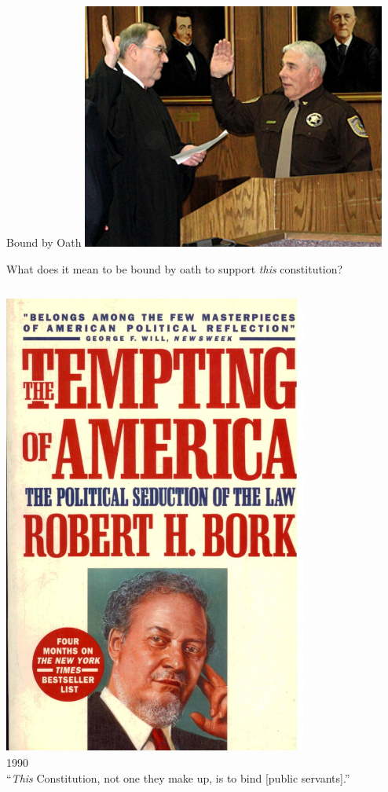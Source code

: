 \begin{frame}{Bound by Oath}
    \centering
    \includegraphics[width=0.75\textwidth]{img/sheriff-oath.png} \\
\end{frame}

\begin{frame}{What does it mean to be bound by oath to support \emph{this} constitution?}
    \begin{columns}[onlytextwidth]
            \centering
            \includegraphics[width=0.75\textwidth]{img/bork-book.jpg} \\
            1990 \\

            ``\emph{This} Constitution, not one they make up, is to bind [public servants].''

    \end{columns}
\end{frame}

